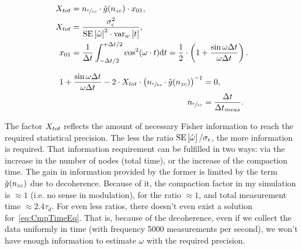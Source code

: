 \documentclass{article}
\begin{document}
%

\newcommand{\dt}{\Delta t}
\begin{align*}
	X_{tot}	&= \Nmnd\cdot \tilde{g}(\Nnd)\cdot x_{01}, \\
	X_{tot}	&= \stat, \\
	x_{01}	&= \frac{1}{\dt}\int_{-\dt/2}^{+\dt/2}\cos^2(\omega\cdot t)\td t = \frac12\cdot \bkt{1 + \frac{\sin\omega\dt}{\omega\dt}}.
\end{align*}

\begin{align}\label{eq:CmpTimeEq}
	1 + \frac{\sin\omega\dt}{\omega\dt} - 2\cdot \stat* \cdot \bkt{\Nmnd\cdot \tilde{g}(\Nnd)}^{-1} &=0, \\
	\Nmnd	&= \frac{\dt}{\dt_{meas}}. \notag
\end{align}

The factor $\stat*$ reflects the amount of necessary Fisher information to reach the required statistical precision. The less the ratio $\SE{\hat{\omega}}/\SD{\meas}$, the more information is required. That information requirement can be fulfilled in two ways: via the increase in the number of nodes (total time), or the increase of the compaction time. The gain in information provided by the former is limited by the term $\tilde{g}(n_{zc})$ due to decoherence. Because of it, the compaction factor in my simulation is $\approx 1$ (i.e. no sense in modulation), for the ratio $\approx 1$, and total measurement time $\approx 2.4\tau_d$. For even less ratios, there doesn't even exist a solution for~\eqref{eq:CmpTimeEq}. That is, because of the decoherence, even if we collect the data uniformly in time (with frequency 5000 measurements per second), we won't have enough information to estimate $\omega$ with the required precision.
\end{document}
